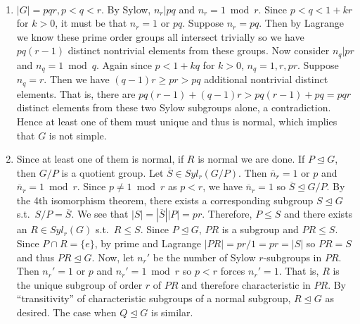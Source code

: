 \documentclass[12pt]{article}
\begin{document}
\begin{problem}[7]
~\begin{enumerate}[label=(\alph*)]
	\item $ |G|=pqr,p<q<r$. By Sylow,  $ n_r | pq$ and  $ n_r = 1 \bmod r$. Since $p<q<1+kr $ for  $ k >0$,  it must be that  $ n_r = 1$ or  $ pq$. Suppose  $ n_r = pq$. Then by Lagrange we know these prime order groups all intersect trivially so we have $ pq(r-1)$ distinct nontrivial elements from these groups. Now consider  $ n_q |pr$ and  $ n_q = 1 \bmod q$. Again since $ p<1+kq$ for  $ k>0$, $ n_q = 1,r,pr$. Suppose $ n_q = r$. Then we have  $ (q-1)r \geq pr > pq$ additional nontrivial distinct elements. That is, there are  $ pq(r-1)+(q-1)r > pq(r-1) + pq = pqr$ distinct elements from these two Sylow subgroups alone, a contradiction. Hence at least one of them must unique and thus is normal, which implies that  $ G$ is not simple.
	\item Since at least one of them is normal, if $ R$ is normal we are done. If  $ P \trianglelefteq G$, then $ G /P$ is a quotient group. Let  $ \overline{S} \in Syl_{ r}( G /P)$. Then $ \overline{n}_r = 1$ or $ p$ and  $ \overline{n}_r = 1 \bmod r$. Since $ p \neq 1 \bmod r$ as $ p<r$, we have  $ \overline{n}_r = 1$ so $ \overline{S} \trianglelefteq G/P$. By the 4th isomorphism theorem, there exists a corresponding subgroup $ S \trianglelefteq G$ s.t.\ $ S / P = \overline{S}$. We see that $ |S| = |\overline{S}||P| = pr$. Therefore, $P \leq S $ and there exists an $ R \in Syl_{ r}( G) $ s.t.\  $ R \leq S$. Since $ P \trianglelefteq G$, $ PR$ is a subgroup and $ PR \leq S$. Since $ P \cap R = \{e\} $, by prime and Lagrange $ |PR| = pr / 1 = pr = |S|$ so $ PR = S$ and thus $ PR \trianglelefteq G$. Now, let $ n_r'$ be the number of Sylow $ r$-subgroups in $ PR$. Then $ n_r'= 1$ or $ p$ and $ n_r' = 1 \bmod r$ so $ p<r$ forces $ n_r'=1$. That is, $ R$ is the unique subgroup of order $ r$ of  $ PR$ and therefore characteristic in $ PR$. By ``transitivity'' of characteristic subgroups of a normal subgroup, $ R \trianglelefteq G$ as desired. The case when $ Q \trianglelefteq G$ is similar.
\end{enumerate}
\end{problem}
\end{document}

